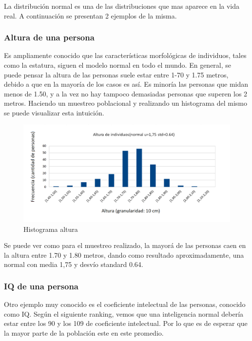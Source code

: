 La distribuci\'on normal es una de las distribuciones que mas aparece en la vida real. A continuaci\'on se presentan 2 ejemplos de la misma.
	
	\subsubsection*{Altura de una persona}
	
		Es ampliamente conocido que las caracter\'isticas morfol\'ogicas de individuos, tales como la estatura, siguen el modelo normal en todo el mundo. En general, se puede pensar la altura de las personas suele estar entre 1-70 y 1.75 metros, debido a que en la mayor\'ia de los casos es as\'i. Es minor\'ia las personas que midan menos de 1.50, y a la vez no hay tampoco demasiadas personas que superen los 2 metros. Haciendo un muestreo poblacional y realizando un histograma del mismo se puede visualizar esta intuici\'on.
		
\begin{figure}[H]
  \begin{center}
    \includegraphics[scale=.40]{imagenes/normal_ejemplo1.png}
    \caption{Histograma altura} 
    \label{fig:normal_ejemplo1}
  \end{center}
\end{figure}		
		
Se puede ver como para el muestreo realizado, la mayor\'a de las personas caen en la altura entre 1.70 y 1.80 metros, dando como resultado aproximadamente, una normal con media 1,75 y desv\'io standard 0.64.

\newpage

	\subsubsection*{IQ de una persona}
	
		Otro ejemplo muy conocido es el coeficiente intelectual de las personas, conocido como IQ. Seg\'un el siguiente ranking, vemos que una inteligencia normal deber\'ia estar entre los 90 y los 109 de coeficiente intelectual. Por lo que es de esperar que la mayor parte de la poblaci\'on este en este promedio.
\newline

